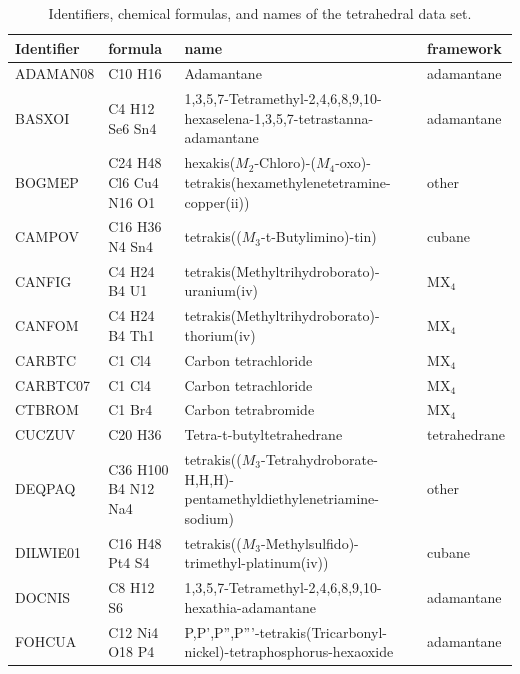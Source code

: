 \documentclass[preprint]{revtex4}              %
\begin{document}




\begin{landscape}
\begin{table}
\caption{Identifiers, chemical formulas, and names of the
tetrahedral data set.}\label{names1} \tiny
\begin{tabular}{llll}
Identifier & formula & name & framework\\
\hline
ADAMAN08 & C10 H16 & Adamantane & adamantane \\
BASXOI & C4 H12 Se6 Sn4 & 1,3,5,7-Tetramethyl-2,4,6,8,9,10-hexaselena-1,3,5,7-tetrastanna-adamantane & adamantane \\
BOGMEP & C24 H48 Cl6 Cu4 N16 O1 & hexakis($M_2$-Chloro)-($M_4$-oxo)-tetrakis(hexamethylenetetramine-copper(ii)) & other \\
CAMPOV & C16 H36 N4 Sn4 & tetrakis(($M_3$-t-Butylimino)-tin) & cubane\\
CANFIG & C4 H24 B4 U1 & tetrakis(Methyltrihydroborato)-uranium(iv) & MX$_4$\\
CANFOM & C4 H24 B4 Th1 & tetrakis(Methyltrihydroborato)-thorium(iv) & MX$_4$\\
CARBTC & C1 Cl4 & Carbon tetrachloride & MX$_4$\\
CARBTC07 & C1 Cl4 & Carbon tetrachloride & MX$_4$\\
CTBROM & C1 Br4 & Carbon tetrabromide & MX$_4$\\
CUCZUV & C20 H36 & Tetra-t-butyltetrahedrane & tetrahedrane\\
DEQPAQ & C36 H100 B4 N12 Na4 & tetrakis(($M_3$-Tetrahydroborate-H,H,H)-pentamethyldiethylenetriamine-sodium) & other\\
DILWIE01 & C16 H48 Pt4 S4 & tetrakis(($M_3$-Methylsulfido)-trimethyl-platinum(iv)) & cubane\\
DOCNIS & C8 H12 S6 & 1,3,5,7-Tetramethyl-2,4,6,8,9,10-hexathia-adamantane & adamantane\\
FOHCUA & C12 Ni4 O18 P4 & P,P',P'',P'''-tetrakis(Tricarbonyl-nickel)-tetraphosphorus-hexaoxide & adamantane\\

\end{tabular}
\end{table}
\end{landscape}
\end{document}
